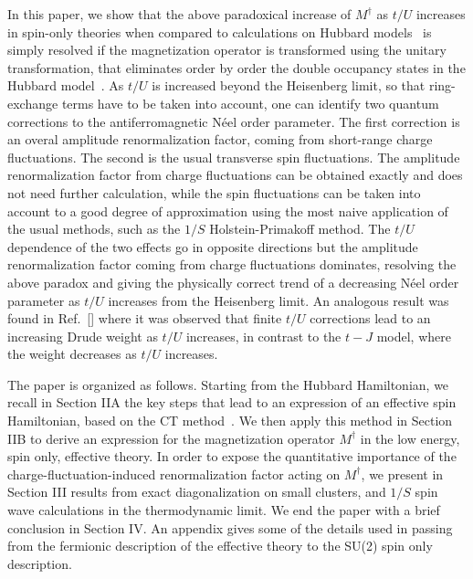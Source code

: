 \documentclass[aps,prb,twocolumn,superscriptaddress,
               amsmath]{revtex4}
\renewcommand{\=}{\,=\,}
\newcommand{\+}{\,+\,}
\renewcommand{\-}{\,-\,}
\begin{document}
In this paper, we show that the above paradoxical increase of
$M^\dagger$ as $t/U$ increases in spin-only theories
when compared to calculations
on Hubbard models~\cite{Schrieffer-RPA,Shi,Fano}
is simply resolved if the magnetization
operator is transformed using the unitary transformation,
that eliminates order by order the double
occupancy states in the Hubbard
model~\cite{Harris,MacDonald,Chernyshev,Eskes:1994,Paramekanti}.
As $t/U$ is increased beyond the Heisenberg limit, so that ring-exchange terms 
have to be taken into account, one can identify two quantum corrections to the
antiferromagnetic N\'eel order parameter. The first correction
is an overal amplitude
renormalization factor, coming from short-range charge fluctuations.
The second is the usual transverse spin fluctuations. The
amplitude renormalization factor from charge fluctuations can be
obtained exactly and does not need further calculation, while the
spin fluctuations can be taken into account to a good degree
of approximation using the most naive application of the usual
methods, such as the
$1/S$ Holstein-Primakoff method.
 The $t/U$ dependence of the two effects go in opposite
directions but the amplitude renormalization factor coming from
charge fluctuations dominates, resolving the above paradox and giving
the physically correct trend
of a decreasing N\'eel order parameter as
$t/U$ increases from the Heisenberg limit.
 An analogous result was found in 
Ref.~[] where it was observed that finite $t/U$ 
corrections lead to an increasing Drude weight as $t/U$ increases, 
in contrast to the $t-J$ model, where the weight decreases as $t/U$ increases.





The paper is organized as follows. Starting from the Hubbard Hamiltonian,
we recall in Section IIA the key steps that
lead to an expression of an
effective spin Hamiltonian, based on the CT
method~\cite{Harris,MacDonald}. We then apply this
method in Section IIB
to derive an  expression for the magnetization operator $M^\dagger$
in the low energy, spin only, effective theory. In
 order to expose the quantitative
importance of the charge-fluctuation-induced
renormalization factor acting on $M^\dagger$,
we present in Section III
results from exact diagonalization on small clusters,
and $1/S$ spin wave calculations in the thermodynamic limit.
We end the paper with a brief conclusion in Section IV.
An appendix gives some of the details used in passing from the
fermionic description of the effective theory to the SU(2) spin only
description.
\end{document}
